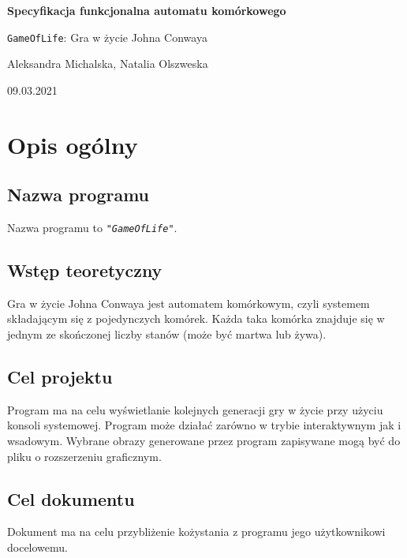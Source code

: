 \documentclass[a4paper]{article}
\begin{document}
\begin{titlepage}
	\begin{center}
		\vspace*{5cm}

	        \Huge
        	\textbf{Specyfikacja funkcjonalna automatu kom\'orkowego}

        	\vspace{1cm}
	        \Huge
        	\texttt{GameOfLife}: Gra w \.zycie Johna Conwaya

    		\vspace{1.5cm}

	        \large
		Aleksandra Michalska, Natalia Olszweska

        	\vfill

	        \vspace{3cm}


		\large 09.03.2021
	\end{center}
\end{titlepage}



\section{Opis og\'olny}
\subsection{Nazwa programu}
\quad Nazwa programu to \texttt{\textit{"GameOfLife"}}.
\subsection{Wst\k{e}p teoretyczny}
\quad Gra w \.zycie Johna Conwaya jest automatem kom\'orkowym, czyli systemem sk\l{}adaj\k{a}cym si\k{e} z pojedynczych kom\'orek. Ka\.zda taka kom\'orka znajduje si\k{e} w jednym ze sko\'nczonej liczby stan\'ow (mo\.ze by\'c martwa lub \.zywa). 
\subsection{Cel projektu}
\quad Program ma na celu wy\'swietlanie kolejnych generacji gry w \.zycie przy u\.zyciu konsoli systemowej. Program mo\.ze dzia\l{}a\'c zar\'owno w trybie interaktywnym jak i wsadowym. Wybrane obrazy generowane przez program zapisywane mog\k{a} by\'c do pliku o rozszerzeniu graficznym.
\subsection{Cel dokumentu}
\quad Dokument ma na celu przybli\.zenie ko\.zystania z programu jego u\.zytkownikowi docelowemu.
\end{document}
